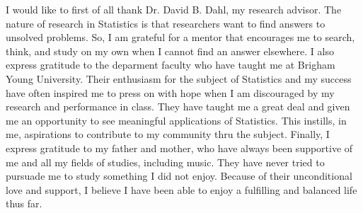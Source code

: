 I would like to first of all thank Dr. David B. Dahl, my research advisor. The
nature of research in Statistics is that researchers want to find answers to
unsolved problems. So, I am grateful for a mentor that encourages me to search,
think, and study on my own when I cannot find an answer elsewhere.  I also
express gratitude to the deparment faculty who have taught me at Brigham Young
University. Their enthusiasm for the subject of Statistics and my success have
often inspired me to press on with hope when I am discouraged by my research
and performance in class. They have taught me a great deal and given me an
opportunity to see meaningful applications of Statistics. This instills, in me,
aspirations to contribute to my community thru the subject. Finally, I express
gratitude to my father and mother, who have always been supportive of me and
all my fields of studies, including music. They have never tried to pursuade me
to study something I did not enjoy. Because of their unconditional love and
support, I believe I have been able to enjoy a fulfilling and balanced life
thus far.
